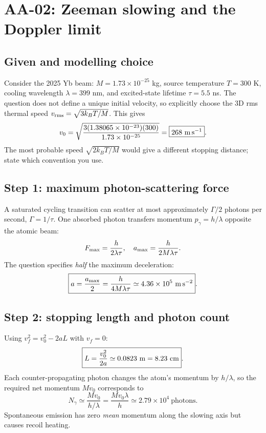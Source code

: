 
\section{AA-02: Zeeman slowing and the Doppler limit}
\subsection*{Given and modelling choice}
Consider the 2025 Yb beam:
\(M=1.73\times10^{-25}\) kg, source temperature
\(T=300\) K, cooling wavelength \(\lambda=399\) nm,
and excited-state lifetime \(\tau=5.5\) ns.
The question does not define a unique initial velocity,
so explicitly choose the 3D rms thermal speed
\(v_{\rm rms}=\sqrt{3k_BT/M}\).
This gives
\[
v_0=\sqrt{\frac{3(1.38065\times10^{-23})(300)}
{1.73\times10^{-25}}}
=\boxed{268\ {\rm m\,s^{-1}}}.
\]
The most probable speed \(\sqrt{2k_BT/M}\) would give a
different stopping distance; state which convention you use.

\subsection*{Step 1: maximum photon-scattering force}
A saturated cycling transition can scatter at most
approximately \(\Gamma/2\) photons per second,
\(\Gamma=1/\tau\). One absorbed photon transfers
momentum \(p_\gamma=h/\lambda\) opposite the atomic beam:
\[
F_{\rm max}=\frac{h}{2\lambda\tau},\quad
a_{\rm max}=\frac{h}{2M\lambda\tau}.
\]
The question specifies \emph{half} the maximum
deceleration:
\[
\boxed{a=\frac{a_{\rm max}}2
=\frac{h}{4M\lambda\tau}
\simeq4.36\times10^{5}\ {\rm m\,s^{-2}}}.
\]

\subsection*{Step 2: stopping length and photon count}
Using \(v_f^2=v_0^2-2aL\) with \(v_f=0\):
\[
\boxed{L=\frac{v_0^2}{2a}
\simeq0.0823\ {\rm m}=8.23\ {\rm cm}}.
\]
Each counter-propagating photon changes the
atom's momentum by \(h/\lambda\), so the required
net momentum \(Mv_0\) corresponds to
\[
\boxed{N_{\gamma}\simeq\frac{Mv_0}{h/\lambda}
=\frac{Mv_0\lambda}{h}
\simeq2.79\times10^4\ \text{photons}}.
\]
Spontaneous emission has zero \emph{mean} momentum
along the slowing axis but causes recoil heating.

